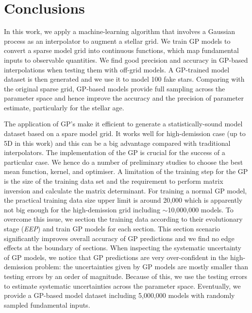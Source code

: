 \section{Conclusions}\label{sec:conclusion}

In this work, we apply a machine-learning algorithm that involves a Gaussian process as an interpolator to augment a stellar grid. We train GP models to convert a sparse model grid into continuous functions, which map fundamental inputs to observable quantities. We find good precision and accuracy in GP-based interpolations when testing them with off-grid models. A GP-trained model dataset is then generated and we use it to model 100 fake stars. Comparing with the original sparse grid, GP-based models provide full sampling across the parameter space and hence improve the accuracy and the precision of parameter estimate, particularly for the stellar age.

The application of GP's make it efficient to generate a statistically-sound model dataset based on a spare model grid. It works well for high-demission case (up to 5D in this work) and this can be a big advantage compared with traditional interpolators. The implementation of the GP is crucial for the success of a particular case. We hence do a number of preliminary studies to choose the best mean function, kernel, and optimiser.  A limitation of the training step for the GP is the size of the training data set and the requirement to perform matrix inversion and calculate the matrix determinant. For training a normal GP model, the practical training data size upper limit is around 20,000 which is apparently not big enough for the high-demission grid including $\sim$10,000,000 models. To overcome this issue, we section the training data according to their evolutionary stage ({\it EEP}) and train GP models for each section. This section scenario significantly improves overall accuracy of GP predictions and we find no edge effects at the boundary of sections. When inspecting the systematic uncertainty of GP models, we notice that GP predictions are very over-confident in the high-demission problem: the uncertainties given by GP models are mostly smaller than testing errors by an order of magnitude. Because of this,  we use the testing errors to estimate systematic uncertainties across the parameter space. Eventually, we provide a GP-based model dataset including 5,000,000 models with randomly sampled fundamental inputs.

